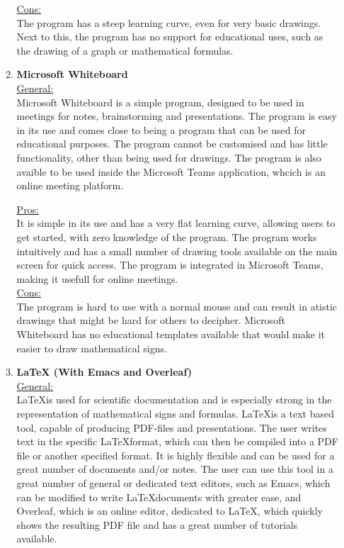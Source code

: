 \documentclass[a4paper,12pt]{article}
\begin{document}
\begin{enumerate}
\begin{enumerate}
    \underline{Cons:}\\
    The program has a steep learning curve, even for very basic drawings. Next to this, the program has no support for educational uses, such as the drawing of a graph or mathematical formulas.\\

  \item \textbf{Microsoft Whiteboard}\\
    \underline{General:}\\
    Microsoft Whiteboard is a simple program, designed to be used in meetings for notes, brainstorming and presentations. The program is easy in its use and comes close to being a program that can be used for educational purposes. The program cannot be customised and has little functionality, other than being used for drawings. The program is also avaible to be used inside the Microsoft Teams application, whcich is an online meeting platform.
    
    \underline{Pros:}\\
    It is simple in its use and has a very flat learning curve, allowing users to get started, with zero knowledge of the program. The program works intuitively and has a small number of drawing tools available on the main screen for quick access. The program is integrated in Microsoft Teams, making it usefull for online meetings.\\
    
    \underline{Cons:}\\
    The program is hard to use with a normal mouse and can result in atistic drawings that might be hard for others to decipher. Microsoft Whiteboard has no educational templates available that would make it easier to draw mathematical signs.\\

  \item \textbf{LaTeX (With Emacs and Overleaf)}\\
    \underline{General:}\\
    \LaTeX is used for scientific documentation and is especially strong in the representation of mathematical signs and formulas. \LaTeX is a text based tool, capable of producing PDF-files and presentations. The user writes text in the specific \LaTeX format, which can then be compiled into a PDF file or another specified format. It is highly flexible and can be used for a great number of documents and/or notes. The user can use this tool in a great number of general or dedicated text editors, such as Emacs, which can be modified to write \LaTeX documents with greater ease, and Overleaf, which is an online editor, dedicated to \LaTeX, which quickly shows the resulting PDF file and has a great number of tutorials available.\\
    

\end{enumerate}
\end{enumerate}
\end{document}
